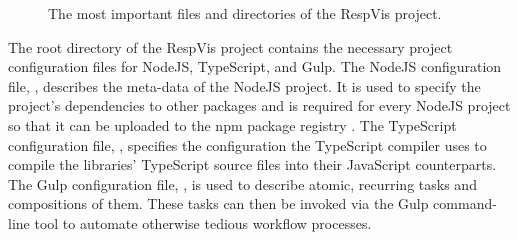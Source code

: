 \begin{figure}[tp]
\centering
{}
\caption[RespVis Directory Structure]{
  The most important files and directories of the RespVis project. 
}
\label{fig:RespVisDirTree}
\end{figure}


The root directory of the RespVis project contains the necessary
project configuration files for NodeJS, TypeScript, and Gulp. The
NodeJS configuration file, , describes the
meta-data of the NodeJS project. It is used to specify the project's
dependencies to other packages and is required for every NodeJS
project so that it can be uploaded to the npm package registry
\parencite{npm}. The TypeScript configuration file,
, specifies the configuration the TypeScript
compiler uses to compile the libraries' TypeScript source files into
their JavaScript counterparts. The Gulp configuration file,
, is used to describe atomic, recurring tasks and
compositions of them. These tasks can then be invoked via the Gulp
command-line tool to automate otherwise tedious workflow processes.

